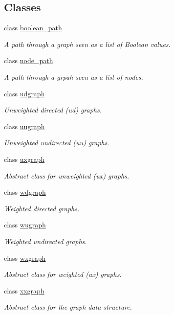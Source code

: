 \subsection*{Classes}
\begin{DoxyCompactItemize}
\item 
class \hyperlink{classlgraph_1_1boolean__path}{boolean\-\_\-path}
\begin{DoxyCompactList}\small\item\em A path through a graph seen as a list of Boolean values. \end{DoxyCompactList}\item 
class \hyperlink{classlgraph_1_1node__path}{node\-\_\-path}
\begin{DoxyCompactList}\small\item\em A path through a grpah seen as a list of nodes. \end{DoxyCompactList}\item 
class \hyperlink{classlgraph_1_1udgraph}{udgraph}
\begin{DoxyCompactList}\small\item\em Unweighted directed (ud) graphs. \end{DoxyCompactList}\item 
class \hyperlink{classlgraph_1_1uugraph}{uugraph}
\begin{DoxyCompactList}\small\item\em Unweighted undirected (uu) graphs. \end{DoxyCompactList}\item 
class \hyperlink{classlgraph_1_1uxgraph}{uxgraph}
\begin{DoxyCompactList}\small\item\em Abstract class for unweighted (ux) graphs. \end{DoxyCompactList}\item 
class \hyperlink{classlgraph_1_1wdgraph}{wdgraph}
\begin{DoxyCompactList}\small\item\em Weighted directed graphs. \end{DoxyCompactList}\item 
class \hyperlink{classlgraph_1_1wugraph}{wugraph}
\begin{DoxyCompactList}\small\item\em Weighted undirected graphs. \end{DoxyCompactList}\item 
class \hyperlink{classlgraph_1_1wxgraph}{wxgraph}
\begin{DoxyCompactList}\small\item\em Abstract class for weighted (ux) graphs. \end{DoxyCompactList}\item 
class \hyperlink{classlgraph_1_1xxgraph}{xxgraph}
\begin{DoxyCompactList}\small\item\em Abstract class for the graph data structure. \end{DoxyCompactList}\end{DoxyCompactItemize}
